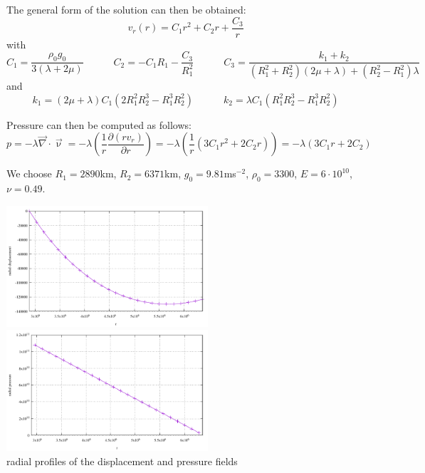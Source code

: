 The general form of the solution can then be obtained:
\begin{equation}
v_r(r)=C_1 r^2 + C_2 r + \frac{C_3}{r}
\end{equation}
with 
\begin{equation}
C_1=\frac{\rho_0 g_0}{3(\lambda+2\mu)}
\quad
\quad
\quad
C_2=-C_1 R_1-\frac{C_3}{R_1^2}
\quad
\quad
\quad
C_3=\frac{k_1+k_2}{(R_1^2+R_2^2)(2\mu+\lambda)+(R_2^2-R_1^2)\lambda}
\end{equation}
and
\begin{equation}
k_1=(2\mu+\lambda) C_1 (2 R_1^2  R_2^3 - R_1^3  R_2^2)
\quad
\quad
\quad
k_2 = \lambda  C_1 (R_1^2  R_2^3 - R_1^3  R_2^2)
\end{equation}

Pressure can then be computed as follows: 
\begin{equation}
p=-\lambda {\vec \nabla}\cdot {\vec \upnu}
= -\lambda \left( \frac{1}{r} \frac{\partial (r v_r)}{\partial r} \right)
= -\lambda \left( \frac{1}{r} ( 3C_1r^2 + 2C_2r  )\right)
= -\lambda ( 3C_1r + 2C_2  )
\end{equation}

We choose $R_1=2890$km, $R_2=6371$km, $g_0=9.81$ms$^{-2}$, $\rho_0=3300$, 
$E=6\cdot10^{10}$, $\nu=0.49$.

\begin{center}
\includegraphics[width=7.5cm]{python_codes/fieldstone_36/results/displacement_rtheta.pdf}
\includegraphics[width=7.5cm]{python_codes/fieldstone_36/results/pressure_rtheta.pdf}\\
{\captionfont radial profiles of the displacement and pressure fields}
\end{center}

